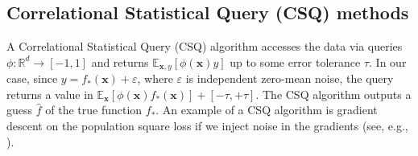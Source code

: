 \documentclass[11pt]{article}
\newcommand{\E}{\mathbb{E}}
\newcommand{\R}{\mathbb{R}}
\newcommand{\eps}{\varepsilon}
\newcommand{\<}{\langle}
\renewcommand{\>}{\rangle}
\theoremstyle{definition}
\def\bx{{\boldsymbol x}}
\def\bx{{\boldsymbol x}}
\def\eps{\varepsilon}
\begin{document}
\subsection{Correlational Statistical Query (CSQ) methods}

A Correlational Statistical Query (CSQ) algorithm \citep{bendavid1995learning,bshouty2002using,reyzin2020statistical} accesses the data via queries $\phi : \R^d \to [-1,1]$ and returns $\E_{\bx,y}[\phi(\bx)y]$ up to some error tolerance $\tau$. In our case, since $y = f_*(\bx) + \eps$, where $\eps$ is independent zero-mean noise, the query returns a value in $\E_{\bx}[\phi(\bx)f_*(\bx)] + [-\tau,+\tau]$. The CSQ algorithm outputs a guess $\hat{f}$ of the true function $f_*$. An example of a CSQ algorithm is gradient descent on the population square loss if we inject noise in the gradients (see, e.g., \cite{abbe2022non}).
\end{document}
